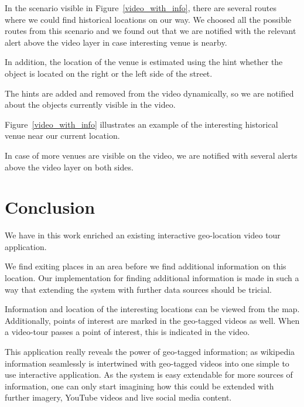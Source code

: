 \documentclass[journal]{IEEEtran}
\begin{document}
	In the scenario visible in Figure~\ref{video_with_info}, there are several routes where we could find historical locations on our way. We choosed all the possible routes from this scenario and we found out that we are notified with the relevant alert above the video layer in case interesting venue is nearby.

	In addition, the location of the venue is estimated using the hint whether the object is located on the right or the left side of the street.
	
	The hints are added and removed from the video dynamically, so we are notified about the objects currently visible in the video.
	
	Figure~\ref{video_with_info} illustrates an example of the interesting historical venue near our current location.

	In case of more venues are visible on the video, we are notified with several alerts above the video layer on both sides.

\section{Conclusion}
We have in this work enriched an existing interactive geo-location video tour application. 

We find exiting places in an area before we find additional information on this location. Our implementation for finding additional information is made in such a way that extending the system with further data sources should be tricial. 

Information and location of the interesting locations can be viewed from the map. Additionally, points of interest are marked in the geo-tagged videos as well. When a video-tour passes a point of interest, this is indicated in the video.

This application really reveals the power of geo-tagged information; as wikipedia information seamlessly is intertwined with geo-tagged videos into one simple to use interactive application. As the system is easy extendable for more sources of information, one can only start imagining how this could be extended with further imagery, YouTube\cite{youtube} videos and live social media content.





\end{document}
